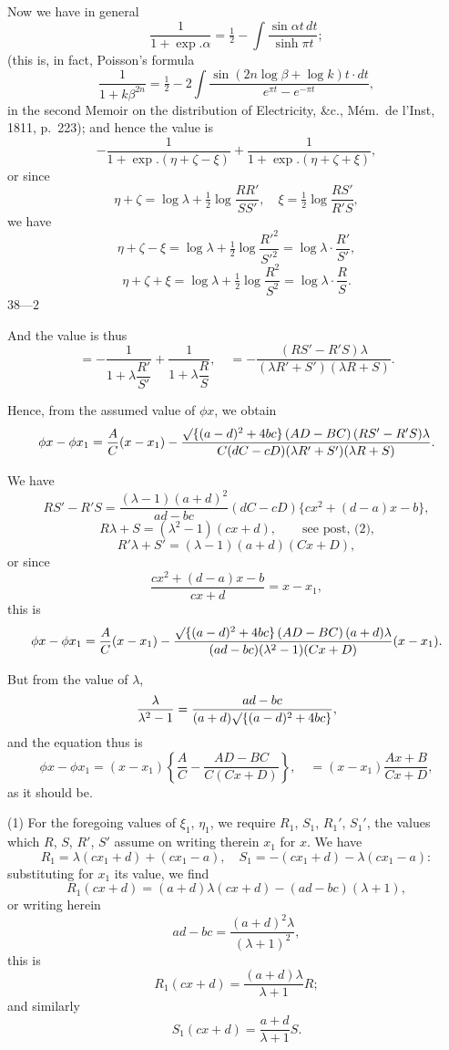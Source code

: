 \documentclass[11pt,a4paper]{book}
\begin{document}
Now we have in general
\[
\frac{1}{1 + \exp. \alpha} = \tfrac{1}{2} - \int \frac{\sin \alpha t \, dt}{\sinh \pi t};
\]
(this is, in fact, Poisson's formula
\[
\frac{1}{1 + k\beta^{2n}} = \tfrac{1}{2} - 2\int \frac{\sin(2n \log \beta + \log k)t \cdot dt}{e^{\pi t} - e^{-\pi t}},
\]
in the second Memoir on the distribution of Electricity, \&c., M\'{e}m.\ de l'Inst, 1811, p.\ 223); and hence the value is
\[
-\frac{1}{1 + \exp. (\eta + \zeta - \xi)} + \frac{1}{1 + \exp. (\eta + \zeta + \xi)},
\]
or since
\[
\eta + \zeta = \log\lambda + \tfrac{1}{2}\log\frac{RR'}{SS'}, \quad \xi = \tfrac{1}{2}\log\frac{RS'}{R'S},
\]
we have
\[
\eta + \zeta - \xi = \log\lambda + \tfrac{1}{2}\log\frac{R'^2}{S'^2} = \log\lambda \cdot \frac{R'}{S'},
\]
\[
\eta + \zeta + \xi = \log\lambda + \tfrac{1}{2}\log\frac{R^2}{S^2} = \log\lambda \cdot \frac{R}{S}.
\]
\hfill $38\text{---}2$

And the value is thus
\[
= -\frac{1}{1 + \lambda \dfrac{R'}{S'}} + \frac{1}{1 + \lambda \dfrac{R}{S}}, \quad = -\frac{(RS' - R'S)\lambda}{(\lambda R' + S')(\lambda R + S)}.
\]

Hence, from the assumed value of $\phi x$, we obtain
\[
\phi x - \phi x_1 = \frac{A}{C}(x - x_1) - \frac{\surd\{(a - d)^2 + 4bc\}\,(AD - BC)\,(RS' - R'S)\lambda}{C(dC - cD)(\lambda R' + S')(\lambda R + S)}.
\]

We have
\[
RS' - R'S = \frac{(\lambda - 1)(a + d)^2}{ad - bc} (dC - cD) \{cx^2 + (d - a)x - b\},
\]
\[
R\lambda + S = (\lambda^2 - 1)(cx + d), \qquad \text{see post, (2),}
\]
\[
R'\lambda + S' = (\lambda - 1)(a + d)(Cx + D),
\]
or since
\[
\frac{cx^2 + (d - a)x - b}{cx + d} = x - x_1,
\]
this is
\[
\phi x - \phi x_1 = \frac{A}{C}(x - x_1) - \frac{\surd\{(a - d)^2 + 4bc\}\,(AD - BC)\,(a + d)\lambda}{(ad - bc)(\lambda^2 - 1)(Cx + D)}(x - x_1).
\]

But from the value of $\lambda$,
\[
\frac{\lambda}{\lambda^2 - 1} = \frac{ad - bc}{(a + d)\surd\{(a - d)^2 + 4bc\}},
\]
and the equation thus is
\[
\phi x - \phi x_1 = (x - x_1)\left\{\frac{A}{C} - \frac{AD - BC}{C(Cx + D)}\right\}, \quad = (x - x_1)\frac{Ax + B}{Cx + D},
\]
as it should be.

(1) For the foregoing values of $\xi_1$, $\eta_1$, we require $R_1$, $S_1$, $R_1'$, $S_1'$, the values which $R$, $S$, $R'$, $S'$ assume on writing therein $x_1$ for $x$. We have
\[
R_1 = \lambda(cx_1 + d) + (cx_1 - a), \quad S_1 = -(cx_1 + d) - \lambda(cx_1 - a):
\]
substituting for $x_1$ its value, we find
\[
R_1(cx + d) = (a + d)\lambda(cx + d) - (ad - bc)(\lambda + 1),
\]
or writing herein
\[
ad - bc = \frac{(a + d)^2\lambda}{(\lambda + 1)^2},
\]
this is
\[
R_1(cx + d) = \frac{(a + d)\lambda}{\lambda + 1} R;
\]
and similarly
\[
S_1(cx + d) = \frac{a + d}{\lambda + 1} S.
\]
\end{document}
